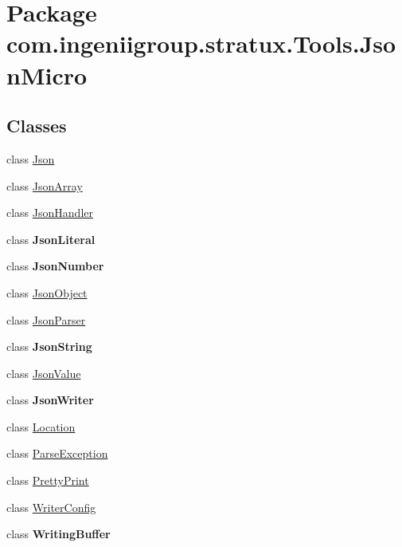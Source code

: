 \hypertarget{namespacecom_1_1ingeniigroup_1_1stratux_1_1_tools_1_1_json_micro}{}\section{Package com.\+ingeniigroup.\+stratux.\+Tools.\+Json\+Micro}
\label{namespacecom_1_1ingeniigroup_1_1stratux_1_1_tools_1_1_json_micro}
\subsection*{Classes}
\begin{DoxyCompactItemize}
\item 
class \hyperlink{classcom_1_1ingeniigroup_1_1stratux_1_1_tools_1_1_json_micro_1_1_json}{Json}
\item 
class \hyperlink{classcom_1_1ingeniigroup_1_1stratux_1_1_tools_1_1_json_micro_1_1_json_array}{Json\+Array}
\item 
class \hyperlink{classcom_1_1ingeniigroup_1_1stratux_1_1_tools_1_1_json_micro_1_1_json_handler}{Json\+Handler}
\item 
class {\bfseries Json\+Literal}
\item 
class {\bfseries Json\+Number}
\item 
class \hyperlink{classcom_1_1ingeniigroup_1_1stratux_1_1_tools_1_1_json_micro_1_1_json_object}{Json\+Object}
\item 
class \hyperlink{classcom_1_1ingeniigroup_1_1stratux_1_1_tools_1_1_json_micro_1_1_json_parser}{Json\+Parser}
\item 
class {\bfseries Json\+String}
\item 
class \hyperlink{classcom_1_1ingeniigroup_1_1stratux_1_1_tools_1_1_json_micro_1_1_json_value}{Json\+Value}
\item 
class {\bfseries Json\+Writer}
\item 
class \hyperlink{classcom_1_1ingeniigroup_1_1stratux_1_1_tools_1_1_json_micro_1_1_location}{Location}
\item 
class \hyperlink{classcom_1_1ingeniigroup_1_1stratux_1_1_tools_1_1_json_micro_1_1_parse_exception}{Parse\+Exception}
\item 
class \hyperlink{classcom_1_1ingeniigroup_1_1stratux_1_1_tools_1_1_json_micro_1_1_pretty_print}{Pretty\+Print}
\item 
class \hyperlink{classcom_1_1ingeniigroup_1_1stratux_1_1_tools_1_1_json_micro_1_1_writer_config}{Writer\+Config}
\item 
class {\bfseries Writing\+Buffer}
\end{DoxyCompactItemize}
